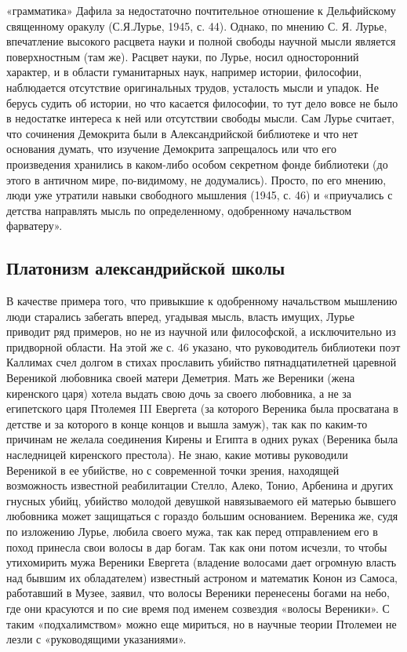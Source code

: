 «грамматика» Дафила за недостаточно почтительное отношение к
Дельфийскому священному оракулу (С.Я.Лурье, 1945, с. 44). Однако, по
мнению С. Я. Лурье, впечатление высокого расцвета науки и полной
свободы научной мысли является поверхностным (там же). Расцвет науки,
по Лурье, носил односторонний характер, и в области гуманитарных наук,
например истории, философии, наблюдается отсутствие оригинальных
трудов, усталость мысли и упадок. Не берусь судить об истории, но что
касается философии, то тут дело вовсе не было в недостатке интереса к
ней или отсутствии свободы мысли. Сам Лурье считает, что сочинения
Демокрита были в Александрийской библиотеке и что нет основания
думать, что изучение Демокрита запрещалось или что его произведения
хранились в каком-либо особом секретном фонде библиотеки (до этого в
античном мире, по-видимому, не додумались). Просто, по его мнению,
люди уже утратили навыки свободного мышления (1945, с. 46) и
«приучались с детства направлять мысль по определенному, одобренному
начальством фарватеру».

\subsection{Платонизм александрийской школы}

В качестве примера того, что привыкшие к одобренному начальством
мышлению люди старались забегать вперед, угадывая мысль, власть
имущих, Лурье приводит ряд примеров, но не из научной или философской,
а исключительно из придворной области. На этой же с. 46 указано, что
руководитель библиотеки поэт Каллимах счел долгом в стихах прославить
убийство пятнадцатилетней царевной Вереникой любовника своей матери
Деметрия. Мать же Вереники (жена киренского царя) хотела выдать свою
дочь за своего любовника, а не за египетского царя Птолемея III
Евергета (за которого Вереника была просватана в детстве и за которого
в конце концов и вышла замуж), так как по каким-то причинам не желала
соединения Кирены и Египта в одних руках (Вереника была наследницей
киренского престола). Не знаю, какие мотивы руководили Вереникой в ее
убийстве, но с современной точки зрения, находящей возможность
известной реабилитации Стелло, Алеко, Тонио, Арбенина и других гнусных
убийц, убийство молодой девушкой навязываемого ей матерью бывшего
любовника может защищаться с гораздо большим основанием. Вереника же,
судя по изложению Лурье, любила своего мужа, так как перед
отправлением его в поход принесла свои волосы в дар богам. Так как они
потом исчезли, то чтобы утихомирить мужа Вереники Евергета (владение
волосами дает огромную власть над бывшим их обладателем) известный
астроном и математик Конон из Самоса, работавший в Музее, заявил, что
волосы Вереники перенесены богами на небо, где они красуются и по сие
время под именем созвездия «волосы Вереники». С таким «подхалимством»
можно еще мириться, но в научные теории Птолемеи не лезли с
«руководящими указаниями».

